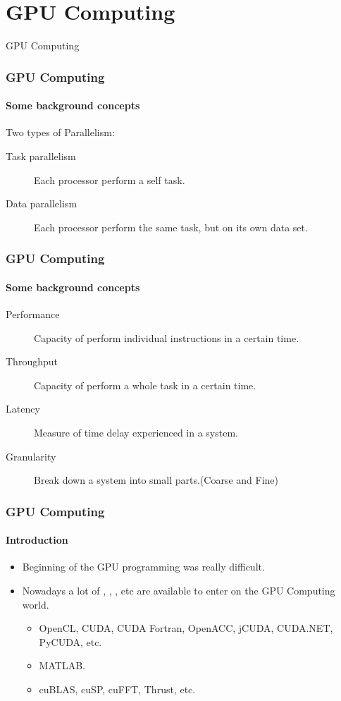 \section{GPU Computing}
\begin{frame}
    \begin{center}
        {\Huge GPU Computing}
    \end{center}
\end{frame}

\begin{frame}
    \frametitle{GPU Computing}
    \framesubtitle{Some background concepts}
    Two types of Parallelism:
    \begin{description}
        \item[Task parallelism]
            Each processor perform a self task.
        \item[Data parallelism]
            Each processor perform the same task, but on its own data set.
    \end{description}
\end{frame}

\begin{frame}
    \frametitle{GPU Computing}
    \framesubtitle{Some background concepts}
    \begin{description}
        \item[Performance]
                Capacity of perform individual instructions in a certain time.
        \item[Throughput]
                Capacity of perform a whole task in a certain time.
        \item[Latency]
                Measure of time delay experienced in a system.
        \item[Granularity]
                Break down a system into small parts.(Coarse and Fine)
    \end{description}
\end{frame}

\begin{frame}
    \frametitle{GPU Computing}
    \framesubtitle{Introduction}
    \begin{itemize}
        \item Beginning of the GPU programming was really difficult.
        \item Nowadays a lot of , , , etc
            are available to enter on the GPU Computing world.
        \begin{itemize}
            \item OpenCL, CUDA, CUDA Fortran, OpenACC, jCUDA, CUDA.NET, PyCUDA, etc.
            \item MATLAB.
            \item cuBLAS, cuSP, cuFFT, Thrust, etc.
        \end{itemize}
    \end{itemize}
\end{frame}

